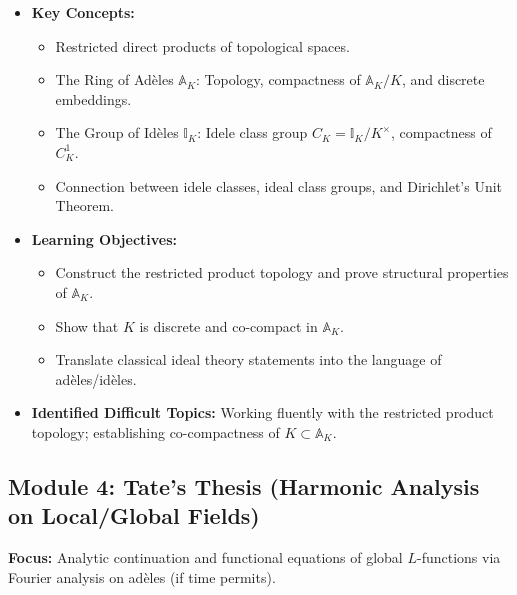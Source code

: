 \documentclass[11pt]{article}
\begin{document}
\begin{itemize}[leftmargin=*]
    \item \textbf{Key Concepts:}
        \begin{itemize}
            \item Restricted direct products of topological spaces.
            \item The Ring of Adèles $\mathbb{A}_K$: Topology, compactness of $\mathbb{A}_K / K$, and discrete embeddings.
            \item The Group of Idèles $\mathbb{I}_K$: Idele class group $C_K = \mathbb{I}_K / K^\times$, compactness of $C_K^1$.
            \item Connection between idele classes, ideal class groups, and Dirichlet's Unit Theorem.
        \end{itemize}
    \item \textbf{Learning Objectives:}
        \begin{itemize}
            \item Construct the restricted product topology and prove structural properties of $\mathbb{A}_K$.
            \item Show that $K$ is discrete and co-compact in $\mathbb{A}_K$.
            \item Translate classical ideal theory statements into the language of adèles/idèles.
        \end{itemize}
    \item \textbf{Identified Difficult Topics:} Working fluently with the restricted product topology; establishing co-compactness of $K \subset \mathbb{A}_K$.
\end{itemize}

\subsection*{Module 4: Tate's Thesis (Harmonic Analysis on Local/Global Fields)}
\textbf{Focus:} Analytic continuation and functional equations of global $L$-functions via Fourier analysis on adèles (if time permits).
\end{document}
